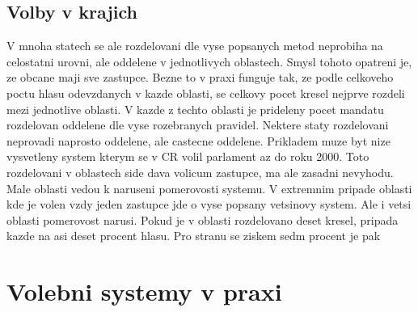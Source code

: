 \documentclass[12pt,a4paper]{report}
\begin{document}

\section{Volby v krajich}
V mnoha statech se ale rozdelovani dle vyse popsanych metod neprobiha na celostatni urovni, ale oddelene v jednotlivych oblastech.
Smysl tohoto opatreni je, ze obcane maji sve  zastupce.
Bezne to v praxi funguje tak, ze podle celkoveho poctu hlasu odevzdanych v kazde oblasti, se celkovy pocet kresel nejprve rozdeli mezi jednotlive oblasti.
V kazde z techto oblasti je prideleny pocet mandatu rozdelovan oddelene dle vyse rozebranych pravidel.
Nektere staty rozdelovani neprovadi naprosto oddelene, ale castecne oddelene.
Prikladem muze byt nize vysvetleny system kterym se v CR volil parlament az do roku 2000. %
Toto rozdelovani v oblastech side dava volicum  zastupce, ma ale zasadni nevyhodu.
Male oblasti vedou k naruseni pomerovosti systemu.
V extremnim pripade oblasti kde je volen vzdy jeden zastupce jde o vyse popsany vetsinovy system. 
Ale i vetsi oblasti pomerovost narusi.
Pokud je v oblasti rozdelovano deset kresel, pripada kazde na asi deset procent hlasu.
Pro stranu se ziskem sedm procent je pak

\chapter{Volebni systemy v praxi}
\end{document}
